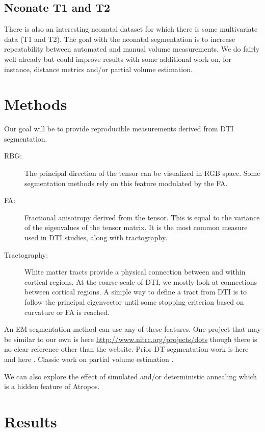 \documentclass[11pt,english]{article}
\begin{document}
\subsection{Neonate T1 and T2} There is also an interesting neonatal
dataset for which there is some multivariate data (T1 and T2).  The
goal with the neonatal segmentation is to increase repeatability
between automated and manual volume measurements.  We do fairly well
already but could improve results with some additional work on, for
instance, distance metrics and/or partial volume estimation.

\section{Methods} Our goal will be to provide reproducible
measurements derived from DTI segmentation.
\begin{description}
\item[RBG:] The principal direction of the tensor can be visualized in
  RGB space.  Some segmentation methods rely on this feature 
  modulated by the FA.
\item[FA:] Fractional anisotropy derived from the tensor.  This is
  equal to the variance of the eigenvalues of the tensor matrix.  It
  is the most common measure used in DTI studies, along with
  tractography. 
\item[Tractography:] White matter tracts provide a physical connection
  between and within cortical regions.  At the coarse scale of DTI, we mostly
  look at connections between cortical regions.  A simple way to
  define a tract from DTI is to follow the principal eigenvector until
  some stopping criterion based on curvature or FA is reached. 
\end{description}
An EM segmentation method can use any of these features.  One project
that may be similar to our own is here
\url{http://www.nitrc.org/projects/dots} though there is no clear
reference other than the website.  Prior DT segmentation work is here
\citep{Lenglet2005} and here \citep{Awate2007}.  Classic work on
partial volume estimation \citep{Santago1993,Shattuck2001}.


We can also explore the effect of simulated and/or deterministic
annealing which is a hidden feature of Atropos. 

\section{Results}
\end{document}
